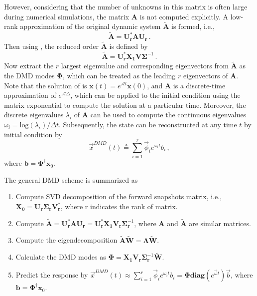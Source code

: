 However, considering that the number of unknowns in this matrix is often large during numerical simulations, the matrix $\mathbf{A}$ is not computed explicitly.
A low-rank approximation of the original dynamic system $\mathbf{\tilde{A}}$ is formed, i.e.,
\begin{equation}
\label{eq:reduced_dmd_1}
\mathbf{\tilde{A}} =  \mathbf{U_r^* A U_r} \, .
\end{equation}
Then using , the reduced order $\mathbf{\tilde{A}}$ is defined by
\begin{equation}
\label{eq:reduced_dmd_2}
\mathbf{\tilde{A}} =  \mathbf{U_r^*} \mathbf{X_1} \mathbf{V} \bm{\Sigma}^{-1} \, .
\end{equation}
Now extract the $r$ largest eigenvalue and corresponding eigenvectors from $\mathbf{\tilde{A}}$ as the DMD modes $\boldsymbol{\Phi}$, which can be treated as the leading $r$ eigenvectors of $\mathbf{A}$.
Note that the solution of  is $\mathbf{x}(t) = e^{\mathcal{A}t}\mathbf{x}(0)$, and $\mathbf{A}$ is a discrete-time approximation of $e^{\mathcal{A}\Delta}$, which can be applied to the initial condition using the matrix exponential to compute the solution at a particular time. 
Moreover, the discrete eigenvalues $\lambda_i$ of $\mathbf{A}$ can be used to compute the continuous eigenvalues $\omega_i= \text{log}(\lambda_i)/\Delta t$.
Subsequently, the state can be reconstructed at any time $t$ by initial condition by  
\begin{equation}
\label{eq:dmd_predict}
\vec{x}^{DMD}(t) \triangleq \sum_{i=1}^{r} \vec{\phi}_i e^{\omega_it} b_i \, ,
\end{equation}
where $\mathbf{b}=\boldsymbol{\Phi}^{\dag} \mathbf{x}_{0}$. 

The general DMD scheme is summarized as
\begin{enumerate}
\item Compute SVD decomposition of the forward snapshots matrix, i.e., $ \mathbf{X_0} = \mathbf{U_r} \boldsymbol{\Sigma_r} \mathbf{V_r^{*}}$, where r indicates the rank of matrix.
\item Compute $\mathbf{\tilde{A}}=\mathbf{U_r^{*}AU_r}=\mathbf{U_r^{*}X_1}\mathbf{V_r}\boldsymbol{\Sigma}_{\mathbf{r}}^{-1}$, where $\mathbf{A}$ and $\mathbf{\tilde{A}}$ are similar matrices.
\item Compute the eigendecomposition $\mathbf{\tilde{A} \tilde{W}}=\boldsymbol{\Lambda}\mathbf{\tilde{W}}$.
\item Calculate the DMD modes as ${\boldsymbol{\Phi}}={\mathbf{X_1V_r}}\boldsymbol{\Sigma}_\mathbf{r}^{-1}{\mathbf{\tilde{W}}}$.
\item Predict the response by $\vec{x}^{DMD}(t) \approx \sum_{i=1}^{r} \vec{\phi}_i e^{\omega_it} b_i = \boldsymbol{\Phi}{\mathbf{diag}}(e^{\vec{\omega}t})\vec{b}$, where $\mathbf{b}=\boldsymbol{\Phi}^{\dag} \mathbf{x}_{0}$.
\end{enumerate}


